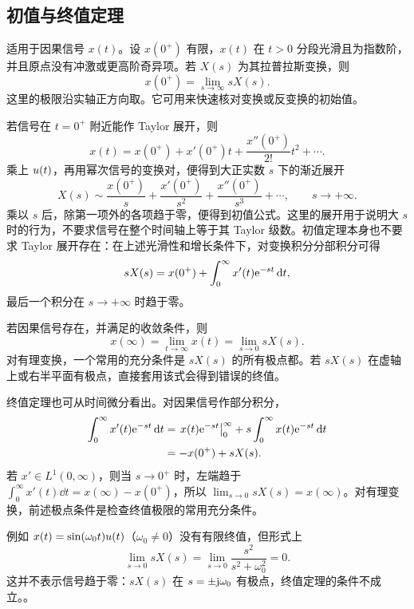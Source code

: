 \subsection{初值与终值定理}
\label{subsec:laplace-initial-final-value}

适用于因果信号 $x(t)$。设 $x(0^+)$ 有限，$x(t)$ 在 $t>0$ 分段光滑且为指数阶，并且原点没有冲激或更高阶奇异项。若 $X(s)$ 为其拉普拉斯变换，则
\begin{equation}
  x(0^+)=\lim_{s\to\infty}sX(s).
  \label{eq:laplace-initial-value-theorem}
\end{equation}
这里的极限沿实轴正方向取。它可用来快速核对变换或反变换的初始值。

若信号在 $t=0^+$ 附近能作 Taylor 展开，则
\[
  x(t)=x(0^+)+x'(0^+)t+\frac{x''(0^+)}{2!}t^2+\cdots.
\]
乘上 $u(t)$，再用幂次信号的变换对，便得到大正实数 $s$ 下的渐近展开
\begin{equation}
  X(s)\sim\frac{x(0^+)}{s}
    +\frac{x'(0^+)}{s^2}
    +\frac{x''(0^+)}{s^3}+\cdots,
    \qquad s\to+\infty.
  \label{eq:laplace-initial-value-derivation}
\end{equation}
乘以 $s$ 后，除第一项外的各项趋于零，便得到初值公式。这里的展开用于说明大 $s$ 时的行为，不要求信号在整个时间轴上等于其 Taylor 级数。初值定理本身也不要求 Taylor 展开存在：在上述光滑性和增长条件下，对变换积分分部积分可得
\[
  sX(s)=x(0^+)+\int_0^\infty x'(t)\mathrm{e}^{-st}\mathop{}\!\mathrm{d} t,
\]
最后一个积分在 $s\to+\infty$ 时趋于零。

若因果信号存在，并满足的收敛条件，则
\begin{equation}
  x(\infty)=\lim_{t\to\infty}x(t)
  =\lim_{s\to0}sX(s).
  \label{eq:laplace-final-value-theorem}
\end{equation}
对有理变换，一个常用的充分条件是 $sX(s)$ 的所有极点都。若 $sX(s)$ 在虚轴上或右半平面有极点，直接套用该式会得到错误的终值。

终值定理也可从时间微分看出。对因果信号作部分积分，
\begin{align}
  \int_0^\infty x'(t)\mathrm{e}^{-st}\mathop{}\!\mathrm{d} t
  &=
  \left.x(t)\mathrm{e}^{-st}\right|_{0}^{\infty}
  +s\int_0^\infty x(t)\mathrm{e}^{-st}\mathop{}\!\mathrm{d} t\\
  &=-x(0^+)+sX(s).
  \label{eq:laplace-final-value-derivation}
\end{align}
若 $x'\in L^1(0,\infty)$，则当 $s\to0^+$ 时，左端趋于
$\int_0^\infty x'(t)\dd t=x(\infty)-x(0^+)$，所以
$\lim_{s\to0}sX(s)=x(\infty)$。对有理变换，前述极点条件是检查终值极限的常用充分条件。

例如 $x(t)=\sin(\omega_0t)u(t)$（$\omega_0\ne0$）没有有限终值，但形式上
\[
  \lim_{s\to0}sX(s)
  =\lim_{s\to0}\frac{s^2}{s^2+\omega_0^2}=0.
\]
这并不表示信号趋于零：$sX(s)$ 在 $s=\pm\mathrm{j}\omega_0$ 有极点，终值定理的条件不成立。。

